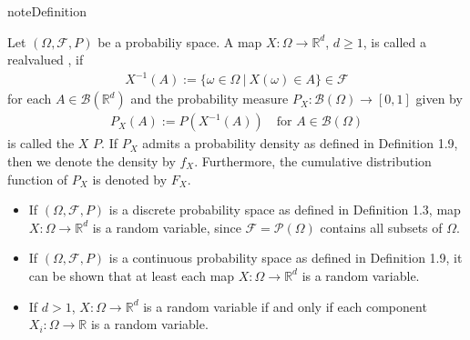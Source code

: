 \documentclass[letterpaper,10pt,english]{jupyterBook}
\begin{document}
\begin{sphinxadmonition}{note}{Definition}

\sphinxAtStartPar
Let \((\Omega, \mathcal{F}, P)\) be a probabiliy space. A map \(X: \Omega \rightarrow \mathbb{R}^d\), \(d \ge 1\), is called a real\sphinxhyphen{}valued , if
\begin{equation*}
\begin{split} X^{-1}(A) := \{ \omega \in \Omega~|~X(\omega) \in A \} \in \mathcal{F}\end{split}
\end{equation*}
\sphinxAtStartPar
for each \(A \in \mathcal{B}(\mathbb{R}^d)\) and the probability measure \(P_X: \mathcal{B}(\Omega) \rightarrow [0, 1]\) given by
\begin{equation*}
\begin{split}P_X(A) := P(X^{-1}(A)) \quad \text{for } A \in \mathcal{B}(\Omega)\end{split}
\end{equation*}
\sphinxAtStartPar
is called the  \(X\)  \(P\). If \(P_X\) admits a probability density as defined in Definition 1.9, then we denote the density by \(f_X\). Furthermore, the cumulative distribution function of \(P_X\) is denoted by \(F_X\).
\end{sphinxadmonition}
\begin{itemize}
\item {} 
\sphinxAtStartPar
If \((\Omega, \mathcal{F}, P)\) is a discrete probability space as defined in Definition 1.3,  map \(X: \Omega \rightarrow \mathbb{R}^d\) is a random variable, since \(\mathcal{F} = \mathcal{P}(\Omega)\) contains all subsets of \(\Omega\).

\item {} 
\sphinxAtStartPar
If \((\Omega, \mathcal{F}, P)\) is a continuous probability space as defined in Definition 1.9, it can be shown that at least each  map \(X: \Omega \rightarrow \mathbb{R}^d\) is a random variable.

\item {} 
\sphinxAtStartPar
If \(d > 1\), \(X: \Omega \rightarrow \mathbb{R}^d\) is a random variable if and only if each component \(X_i: \Omega \rightarrow \mathbb{R}\) is a random variable.

\end{itemize}
\end{document}

